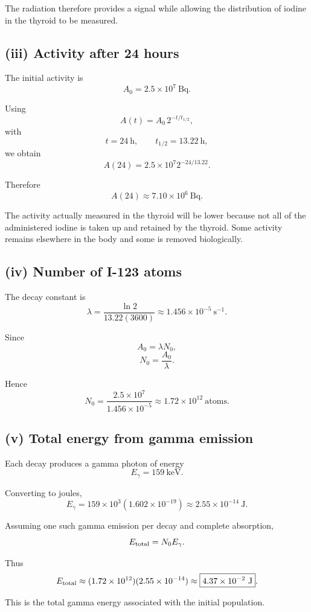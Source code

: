 \documentclass[11pt,a4paper]{article}
\begin{document}
The radiation therefore provides a signal while allowing the distribution of
iodine in the thyroid to be measured.

\subsection{(iii) Activity after 24 hours}

The initial activity is
\[
A_0=2.5\times10^7\ \mathrm{Bq}.
\]

Using
\[
A(t)=A_0\,2^{-t/t_{1/2}},
\]
with
\[
t=24\ \mathrm h,
\qquad
t_{1/2}=13.22\ \mathrm h,
\]
we obtain
\[
A(24)
=
2.5\times10^7
2^{-24/13.22}.
\]

Therefore
\[
\boxed{A(24)\approx7.10\times10^6\ \mathrm{Bq}}.
\]

The activity actually measured in the thyroid will be lower because not all of
the administered iodine is taken up and retained by the thyroid. Some activity
remains elsewhere in the body and some is removed biologically.

\subsection{(iv) Number of I-123 atoms}

The decay constant is
\[
\lambda
=
\frac{\ln2}{13.22(3600)}
\approx1.456\times10^{-5}\ \mathrm{s^{-1}}.
\]

Since
\[
A_0=\lambda N_0,
\]
\[
N_0=\frac{A_0}{\lambda}.
\]

Hence
\[
N_0
=
\frac{2.5\times10^7}{1.456\times10^{-5}}
\approx
\boxed{1.72\times10^{12}\ \text{atoms}}.
\]

\subsection{(v) Total energy from gamma emission}

Each decay produces a gamma photon of energy
\[
E_\gamma=159\ \mathrm{keV}.
\]

Converting to joules,
\[
E_\gamma
=
159\times10^3(1.602\times10^{-19})
\approx
2.55\times10^{-14}\ \mathrm J.
\]

Assuming one such gamma emission per decay and complete absorption,
\[
E_{\rm total}=N_0E_\gamma.
\]

Thus
\[
E_{\rm total}
\approx
(1.72\times10^{12})(2.55\times10^{-14})
\approx
\boxed{4.37\times10^{-2}\ \mathrm J}.
\]

This is the total gamma energy associated with the initial population.
\end{document}
